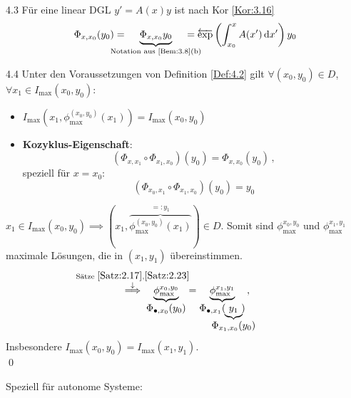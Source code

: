\documentclass[a4paper]{article}
\begin{document}
\begin{Bemerkung}{}{4.3}
Für eine linear DGL $y'=A(x)y$ ist nach Kor \ref{Kor:3.16}
\[\Phi_{x,x_0}(y_0)=\hspace{-0.6cm}\underbrace{\Phi_{x,x_0}y_0}_{\text{Notation aus \ref{Bem:3.8}(b)}}\hspace{-0.6cm}=\overleftarrow{\exp}\left(\int_{x_0}^xA(x')\dd x'\right)y_0\]
\end{Bemerkung}

\begin{Lemma}{}{4.4}
Unter den Voraussetzungen von Definition \ref{Def:4.2} gilt $\forall (x_0,y_0)\in D$, $\forall x_1\in I_{\max}(x_0,y_0)$:
\begin{itemize}
\item $I_{\max}\left(x_1,\phi_{\max}^{(x_0,y_0)}(x_1)\right)=I_{\max}(x_0,y_0)$
\item  \textbf{Kozyklus-Eigenschaft}: 
\[(\Phi_{x,x_1}\circ\Phi_{x_1,x_0})(y_0)=\Phi_{x,x_0}(y_0)\,,\] speziell für $x=x_0$: 
\[(\Phi_{x_0,x_1}\circ\Phi_{x_1,x_0})(y_0)=y_0\]
\end{itemize}
\end{Lemma}

\begin{Beweis}
$x_1\in I_{\max}(x_0,y_0)\implies (x_1,\overbrace{\phi_{\max}^{(x_0,y_0)}(x_1)}^{=:y_1})\in D$.
Somit sind $\phi_{\max}^{x_0,y_0}$ und $\phi_{\max}^{x_1,y_1}$ maximale Lösungen, die in $(x_1,y_1)$ übereinstimmen. 
\[\overset{\mathclap{\substack{\text{Sätze }\ref{Satz:2.17},\ref{Satz:2.23}\\\downarrow}}}{\implies}
\underbrace{\phi_{\max}^{x_0,y_0}}_{\displaystyle\Phi_{\bullet,x_0}(y_0)}=\underbrace{\phi_{\max}^{x_1,y_1}}_{\displaystyle\Phi_{\bullet,x_1}(\hspace{-0.5cm}\underbrace{y_1}_{\displaystyle\Phi_{x_1,x_0}(y_0)}\hspace{-0.5cm})}\,,\]
Insbesondere $I_{\max}(x_0,y_0)=I_{\max}(x_1,y_1)$.\\\qed
\end{Beweis}

Speziell für autonome Systeme:
\end{document}
